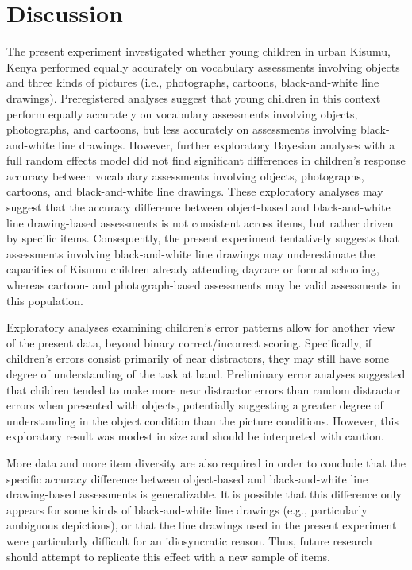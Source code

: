 \documentclass[10pt, letterpaper]{article}
\begin{document}
\section{Discussion}\label{discussion}

The present experiment investigated whether young children in urban
Kisumu, Kenya performed equally accurately on vocabulary assessments
involving objects and three kinds of pictures (i.e., photographs,
cartoons, black-and-white line drawings). Preregistered analyses suggest
that young children in this context perform equally accurately on
vocabulary assessments involving objects, photographs, and cartoons, but
less accurately on assessments involving black-and-white line drawings.
However, further exploratory Bayesian analyses with a full random
effects model did not find significant differences in children's
response accuracy between vocabulary assessments involving objects,
photographs, cartoons, and black-and-white line drawings. These
exploratory analyses may suggest that the accuracy difference between
object-based and black-and-white line drawing-based assessments is not
consistent across items, but rather driven by specific items.
Consequently, the present experiment tentatively suggests that
assessments involving black-and-white line drawings may underestimate
the capacities of Kisumu children already attending daycare or formal
schooling, whereas cartoon- and photograph-based assessments may be
valid assessments in this population.

Exploratory analyses examining children's error patterns allow for
another view of the present data, beyond binary correct/incorrect
scoring. Specifically, if children's errors consist primarily of near
distractors, they may still have some degree of understanding of the
task at hand. Preliminary error analyses suggested that children tended
to make more near distractor errors than random distractor errors when
presented with objects, potentially suggesting a greater degree of
understanding in the object condition than the picture conditions.
However, this exploratory result was modest in size and should be
interpreted with caution.

More data and more item diversity are also required in order to conclude
that the specific accuracy difference between object-based and
black-and-white line drawing-based assessments is generalizable. It is
possible that this difference only appears for some kinds of
black-and-white line drawings (e.g., particularly ambiguous depictions),
or that the line drawings used in the present experiment were
particularly difficult for an idiosyncratic reason. Thus, future
research should attempt to replicate this effect with a new sample of
items.
\end{document}
